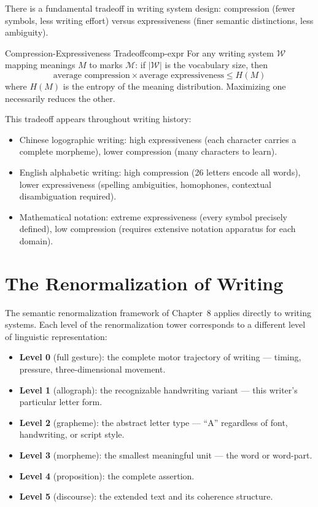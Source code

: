 There is a fundamental tradeoff in writing system design: compression
(fewer symbols, less writing effort) versus expressiveness (finer
semantic distinctions, less ambiguity).

\begin{proposition}{Compression-Expressiveness Tradeoff}{comp-expr}
  For any writing system $\mathcal{W}$ mapping meanings $M$ to marks
  $\mathcal{M}$: if $|\mathcal{W}|$ is the vocabulary size, then
  \[
    \text{average compression} \times \text{average expressiveness}
    \leq H(M)
  \]
  where $H(M)$ is the entropy of the meaning distribution. Maximizing
  one necessarily reduces the other.
\end{proposition}

This tradeoff appears throughout writing history:
\begin{itemize}
  \item Chinese logographic writing: high expressiveness (each character
        carries a complete morpheme), lower compression (many characters
        to learn).
  \item English alphabetic writing: high compression (26 letters encode
        all words), lower expressiveness (spelling ambiguities, homophones,
        contextual disambiguation required).
  \item Mathematical notation: extreme expressiveness (every symbol
        precisely defined), low compression (requires extensive notation
        apparatus for each domain).
\end{itemize}

\section{The Renormalization of Writing}

The semantic renormalization framework of Chapter~8 applies directly
to writing systems. Each level of the renormalization tower corresponds
to a different level of linguistic representation:

\begin{itemize}
  \item \textbf{Level 0} (full gesture): the complete motor trajectory
        of writing — timing, pressure, three-dimensional movement.
  \item \textbf{Level 1} (allograph): the recognizable handwriting
        variant — this writer's particular letter form.
  \item \textbf{Level 2} (grapheme): the abstract letter type —
        ``A'' regardless of font, handwriting, or script style.
  \item \textbf{Level 3} (morpheme): the smallest meaningful unit —
        the word or word-part.
  \item \textbf{Level 4} (proposition): the complete assertion.
  \item \textbf{Level 5} (discourse): the extended text and its
        coherence structure.
\end{itemize}

